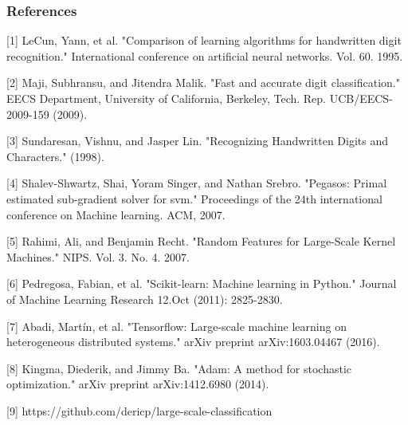 \documentclass{article} %
\begin{document}
\subsubsection*{References}

\small{
  [1] LeCun, Yann, et al. "Comparison of learning algorithms for handwritten
  digit recognition." International conference on artificial neural networks.
  Vol. 60. 1995.	

  [2] Maji, Subhransu, and Jitendra Malik. "Fast and accurate digit
  classification." EECS Department, University of California,
  Berkeley, Tech. Rep. UCB/EECS-2009-159 (2009).

  [3] Sundaresan, Vishnu, and Jasper Lin. "Recognizing Handwritten Digits and
  Characters." (1998).

  [4] Shalev-Shwartz, Shai, Yoram Singer, and Nathan Srebro. "Pegasos: Primal
  estimated sub-gradient solver for svm." Proceedings of the 24th international
  conference on Machine learning. ACM, 2007.

  [5] Rahimi, Ali, and Benjamin Recht. "Random Features for Large-Scale Kernel
  Machines." NIPS. Vol. 3. No. 4. 2007.

  [6] Pedregosa, Fabian, et al. "Scikit-learn: Machine learning in Python."
  Journal of Machine Learning Research 12.Oct (2011): 2825-2830.

  [7] Abadi, Martín, et al. "Tensorflow: Large-scale machine learning on
  heterogeneous distributed systems." arXiv preprint arXiv:1603.04467 (2016).

  [8] Kingma, Diederik, and Jimmy Ba. "Adam: A method for stochastic
  optimization." arXiv preprint arXiv:1412.6980 (2014).

  [9] https://github.com/dericp/large-scale-classification
}
\end{document}
